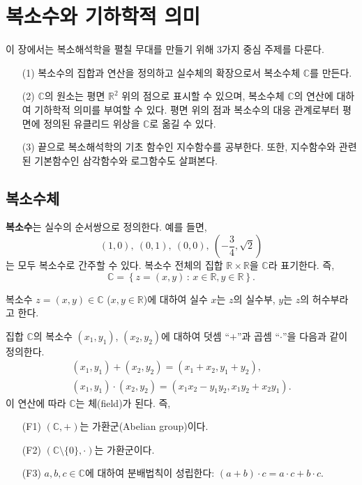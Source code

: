 
\chapter{복소수와 기하학적 의미}


이 장에서는 복소해석학을 펼칠 무대를 만들기 위해
 3가지 중심 주제를 다룬다.
\begin{itemize}
\item[(1)] 복소수의 집합과 연산을 정의하고 실수체의 확장으로서 복소수체 $\mathbb C$를 만든다.
\item[(2)] $\mathbb C$의 원소는 평면 $\mathbb R^2$ 위의 점으로 표시할 수 있으며, 복소수체 $\mathbb C$의 연산에 대하여
기하학적 의미를 부여할 수 있다.  평면 위의 점과  복소수의 대응 관계로부터
평면에 정의된 유클리드 위상을 $\mathbb C$로 옮길 수 있다.
\item[(3)] 끝으로 복소해석학의 기초 함수인 지수함수를 공부한다.
또한, 지수함수와 관련된 기본함수인 삼각함수와 로그함수도 살펴본다. 
\end{itemize}

\section{복소수체}

{\bf 복소수}는 실수의 순서쌍으로 정의한다. 예를 들면,
$$
(1,0), \ (0,1), \ (0,0), \ \left(-\dfrac34, \sqrt{2} \right)
$$
는 모두 복소수로 간주할 수 있다.
복소수 전체의 집합 $\mathbb R \times \mathbb R$을 $\mathbb C$라 표기한다. 즉,
$$
\mathbb C = \left\{ z = (x,y) \,:\, x\in \mathbb R,   y\in \mathbb R \right\}.
$$

복소수 $z=(x,y)\in \mathbb C$ ($x,y \in \mathbb R$)에 대하여
실수 $x$는 $z$의 실수부, $y$는 $z$의 허수부라고 한다.

집합 $\mathbb C$의
복소수 $(x_1, y_1)$, $(x_2, y_2)$에 대하여
덧셈 ``$+$''과 곱셈 ``$\cdot$''을 다음과 같이 정의한다.
\begin{gather*}
(x_1, y_1) + (x_2, y_2) = (x_1+x_2, y_1+y_2), \\
(x_1, y_1) \cdot (x_2, y_2) = (x_1x_2 - y_1y_2, x_1y_2 + x_2y_1).
\end{gather*}
이 연산에 따라 $\mathbb C$는 체(field)가 된다. 즉,
\begin{itemize}
\item[(F1)]  $(\mathbb C, +)$는 가환군(Abelian group)이다.
\item[(F2)] $(\mathbb C\setminus \{0\}, \cdot)$는 가환군이다.
\item[(F3)] $a,b,c\in\mathbb C$에 대하여 분배법칙이 성립한다:  $(a+b)\cdot c = a\cdot c + b\cdot c$.
\end{itemize}

